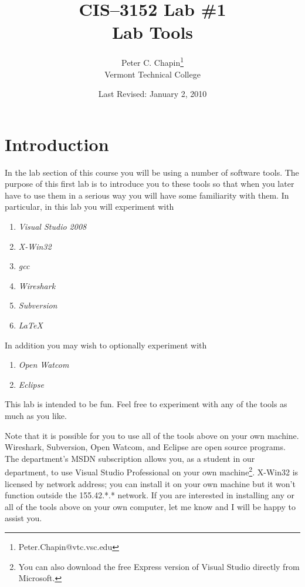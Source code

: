 \documentclass[twocolumn]{article}
\begin{document}
\title{CIS--3152 Lab \#1\\Lab Tools}
\author{Peter C. Chapin\thanks{Peter.Chapin@vtc.vsc.edu}\\
  Vermont Technical College}
\date{Last Revised: January 2, 2010}
\maketitle

\section*{Introduction}

In the lab section of this course you will be using a number of software tools. The purpose of
this first lab is to introduce you to these tools so that when you later have to use them in a
serious way you will have some familiarity with them. In particular, in this lab you will
experiment with

\begin{enumerate}

\item \textit{Visual Studio 2008}

\item \textit{X-Win32}

\item \textit{gcc}

\item \textit{Wireshark}

\item \textit{Subversion}

\item \textit{\LaTeX}

\end{enumerate}

In addition you may wish to optionally experiment with

\begin{enumerate}

\item \textit{Open Watcom}

\item \textit{Eclipse}

\end{enumerate}

This lab is intended to be fun. Feel free to experiment with any of the tools as much as you
like.

Note that it is possible for you to use all of the tools above on your own machine. Wireshark,
Subversion, Open Watcom, and Eclipse are open source programs. The department's MSDN
subscription allows you, as a student in our department, to use Visual Studio Professional on
your own machine\footnote{You can also download the free Express version of Visual Studio
  directly from Microsoft.}. X-Win32 is licensed by network address; you can install it on your
own machine but it won't function outside the 155.42.*.* network. If you are interested in
installing any or all of the tools above on your own computer, let me know and I will be happy
to assist you.
\end{document}
